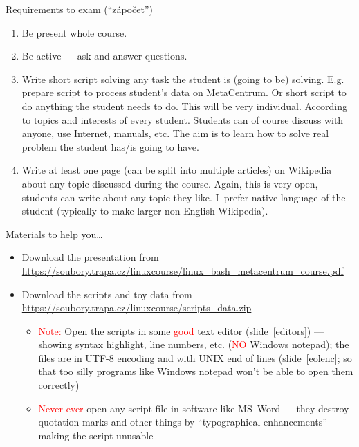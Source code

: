 \documentclass[compress, ucs, xelatex, 11pt, xcolor=svgnames, aspectratio=169,
	hyperref={
		bookmarks=true,
		unicode=true,
		colorlinks=true,
		pdftitle={Linux, command line and MetaCentrum},
		plainpages=false,
		pdfauthor={Vojtech Zeisek},
		pdfsubject={Course about use of Linux command line, writing shell scripts and using MetaCentrum of CESNET},
		pdfcreator={XeLaTeX},
		pdfkeywords={Linux, GNU, BASH, shell, command line, MetaCentrum},
		linkcolor=DarkRed, %
		anchorcolor=DarkBlue, %
		citecolor=Indigo, %
		filecolor=NavyBlue, %
		menucolor=DarkMagenta, %
		urlcolor=DarkBlue, %
		pdftex},
	url={hyphens, lowtilde} %
	]{beamer}
\renewcommand{\alert}[1]{\textcolor{red}{#1}}
\begin{document}
\begin{frame}{Requirements to exam (\enquote{zápočet})}
	\begin{enumerate}
		\item Be present whole course.
		\item Be active --- ask and answer questions.
		\item Write short script solving any task the student is (going to be) solving. E.g. prepare script to process student's data on MetaCentrum. Or short script to do anything the student needs to do. This will be very individual. According to topics and interests of every student. Students can of course discuss with anyone, use Internet, manuals, etc. The aim is to learn how to solve real problem the student has/is going to have.
		\item Write at least one page (can be split into multiple articles) on Wikipedia about any topic discussed during the course. Again, this is very open, students can write about any topic they like. I~prefer native language of the student (typically to make larger non-English Wikipedia).
	\end{enumerate}
\end{frame}

\begin{frame}{Materials to help you\ldots}
	\label{materials}
	\begin{itemize}
		\item Download the presentation from \url{https://soubory.trapa.cz/linuxcourse/linux_bash_metacentrum_course.pdf}
		\item Download the scripts and toy data from \url{https://soubory.trapa.cz/linuxcourse/scripts_data.zip}
		\begin{itemize}
			\item \alert{Note:} Open the scripts in some \alert{good} text editor (slide~\ref{editors}) --- showing syntax highlight, line numbers, etc. (\alert{NO} Windows notepad); the files are in UTF-8 encoding and with UNIX end of lines (slide~\ref{eolenc}; so that too silly programs like Windows notepad won't be able to open them correctly)
			\item \alert{Never ever} open any script file in software like MS~Word --- they destroy quotation marks and other things by \enquote{typographical enhancements} making the script unusable
		\end{itemize}
	\end{itemize}
\end{frame}
\end{document}
